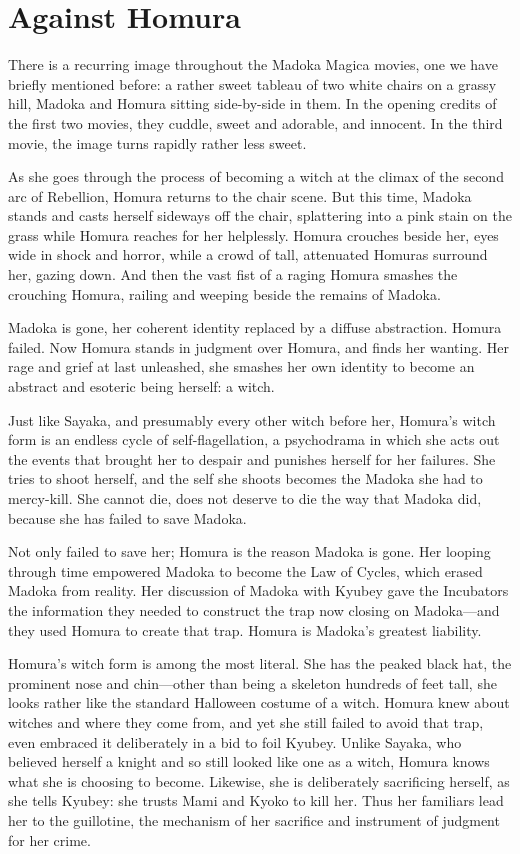 \chapter{Against Homura}
There is a recurring image throughout the Madoka Magica movies, one we have briefly mentioned before: a rather sweet tableau of two white chairs on a grassy hill, Madoka and Homura sitting side-by-side in them. In the opening credits of the first two movies, they cuddle, sweet and adorable, and innocent. In the third movie, the image turns rapidly rather less sweet.

As she goes through the process of becoming a witch at the climax of the second arc of Rebellion, Homura returns to the chair scene. But this time, Madoka stands and casts herself sideways off the chair, splattering into a pink stain on the grass while Homura reaches for her helplessly. Homura crouches beside her, eyes wide in shock and horror, while a crowd of tall, attenuated Homuras surround her, gazing down. And then the vast fist of a raging Homura smashes the crouching Homura, railing and weeping beside the remains of Madoka.

Madoka is gone, her coherent identity replaced by a diffuse abstraction. Homura failed. Now Homura stands in judgment over Homura, and finds her wanting. Her rage and grief at last unleashed, she smashes her own identity to become an abstract and esoteric being herself: a witch. 

Just like Sayaka, and presumably every other witch before her, Homura's witch form is an endless cycle of self-flagellation, a psychodrama in which she acts out the events that brought her to despair and punishes herself for her failures. She tries to shoot herself, and the self she shoots becomes the Madoka she had to mercy-kill. She cannot die, does not deserve to die the way that Madoka did, because she has failed to save Madoka.

Not only failed to save her; Homura is the reason Madoka is gone. Her looping through time empowered Madoka to become the Law of Cycles, which erased Madoka from reality. Her discussion of Madoka with Kyubey gave the Incubators the information they needed to construct the trap now closing on Madoka—and they used Homura to create that trap. Homura is Madoka's greatest liability.

Homura's witch form is among the most literal. She has the peaked black hat, the prominent nose and chin—other than being a skeleton hundreds of feet tall, she looks rather like the standard Halloween costume of a witch. Homura knew about witches and where they come from, and yet she still failed to avoid that trap, even embraced it deliberately in a bid to foil Kyubey. Unlike Sayaka, who believed herself a knight and so still looked like one as a witch, Homura knows what she is choosing to become. Likewise, she is deliberately sacrificing herself, as she tells Kyubey: she trusts Mami and Kyoko to kill her. Thus her familiars lead her to the guillotine, the mechanism of her sacrifice and instrument of judgment for her crime.

